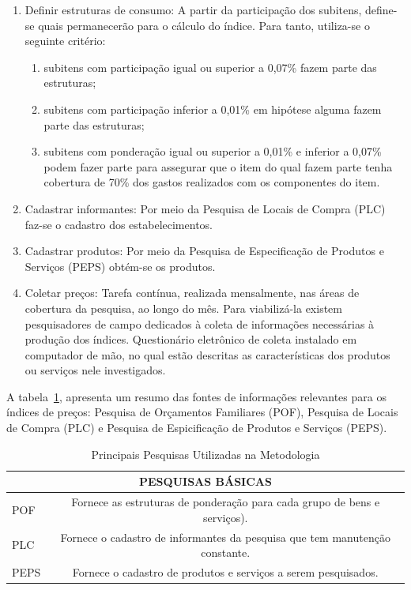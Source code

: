 \documentclass[twoside,a4paper,11pt]{report}
\begin{document}
\begin{enumerate}
\begin{enumerate}
  \end{enumerate}
  \item Definir estruturas de consumo: A partir da participação dos subitens, define-se quais permanecerão para o cálculo do índice. Para tanto, utiliza-se o seguinte critério:
    \begin{enumerate}
    \item subitens com participação igual ou superior a 0,07\% fazem parte das estruturas;
    \item subitens com participação inferior a 0,01\% em hipótese alguma fazem parte das estruturas;
    \item subitens com ponderação igual ou superior a 0,01\% e inferior a 0,07\% podem fazer parte para assegurar que o item do qual fazem parte tenha cobertura de 70\% dos gastos realizados com os componentes do item.
    \end{enumerate}
  \item Cadastrar informantes: Por meio da Pesquisa de Locais de Compra (PLC) faz-se o cadastro dos estabelecimentos.
  \item Cadastrar produtos: Por meio da Pesquisa de Especificação de Produtos e Serviços (PEPS) obtém-se os produtos.
  \item Coletar preços: Tarefa contínua, realizada mensalmente, nas áreas de cobertura da pesquisa, ao longo do mês. Para viabilizá-la existem pesquisadores de campo dedicados à coleta de informações necessárias à produção dos índices. Questionário eletrônico de coleta instalado em computador de mão, no qual estão descritas as características dos produtos ou serviços nele investigados.
\end{enumerate}

A tabela~\ref{tab01ap01}, apresenta um resumo das fontes de informações relevantes para os índices de preços: Pesquisa de Orçamentos Familiares (POF), Pesquisa de Locais de Compra (PLC) e Pesquisa de Espicificação de Produtos e Serviços (PEPS).

\begin{table}[h]
\centering
\begin{tabular}{lc}
\hline
\multicolumn{2}{c}{PESQUISAS BÁSICAS}                                            \\ \hline
POF & Fornece as estruturas de ponderação para cada grupo de bens e serviços).   \\
PLC & Fornece o cadastro de informantes da pesquisa que tem manutenção constante.\\ 
PEPS & Fornece o cadastro de produtos e serviços a serem pesquisados.            \\ \hline
\end{tabular}
\caption{Principais Pesquisas Utilizadas na Metodologia}
\label{tab01ap01}
\end{table}
\end{document}
